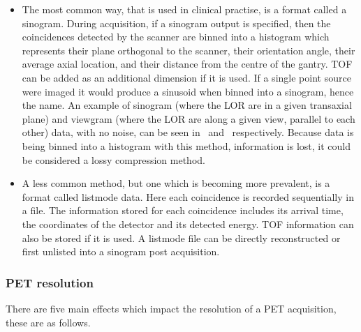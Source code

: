                 \begin{itemize}
                    \item The most common way, that is used in clinical practise, is a format called a sinogram. During acquisition, if a sinogram output is specified, then the coincidences detected by the scanner are binned into a histogram which represents their plane orthogonal to the scanner, their orientation angle, their average axial location, and their distance from the centre of the gantry. \gls{TOF} can be added as an additional dimension if it is used. %
                    If a single point source were imaged it would produce a sinusoid when binned into a sinogram, hence the name. An example of sinogram (where the \gls{LOR} are in a given transaxial plane) and viewgram (where the \gls{LOR} are along a given view, parallel to each other) data, with no noise, can be seen in~ and~ respectively. Because data is being binned into a histogram with this method, information is lost, it could be considered a lossy compression method.
                    
                    \item A less common method, but one which is becoming more prevalent, is a format called listmode data. Here each coincidence is recorded sequentially in a file. The information stored for each coincidence includes its arrival time, the coordinates of the detector and its detected energy. \gls{TOF} information can also be stored if it is used. %
                    A listmode file can be directly reconstructed or first unlisted into a sinogram post acquisition. %
                \end{itemize}
            
            \subsubsection{PET resolution} \label{sec:pet_resolution}
                There are five main effects which impact the resolution of a \gls{PET} acquisition, these are as follows.
                
